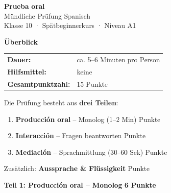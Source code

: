 \documentclass[11pt, a4paper]{article}
\newcommand{\teil}[2]{\noindent\textbf{\large Teil #1: #2}}
\begin{document}
\begin{center}
    {\LARGE\bfseries Prueba oral}\\[4pt]
    {\large Mündliche Prüfung Spanisch}\\[8pt]
    {\normalsize Klasse 10 · Spätbeginnerkurs · Niveau A1}
\end{center}

\vspace{8pt}


\begin{infobox}
\textbf{Überblick}

\vspace{4pt}

\begin{tabular}{@{}ll@{}}
\textbf{Dauer:} & ca. 5--6 Minuten pro Person \\
\textbf{Hilfsmittel:} & keine \\
\textbf{Gesamtpunktzahl:} & 15 Punkte \\
\end{tabular}

\vspace{6pt}

Die Prüfung besteht aus \textbf{drei Teilen}:
\begin{enumerate}[leftmargin=2em, itemsep=2pt]
    \item \textbf{Producción oral} -- Monolog (1--2 Min)  Punkte
    \item \textbf{Interacción} -- Fragen beantworten  Punkte
    \item \textbf{Mediación} -- Sprachmittlung (30--60 Sek)  Punkte
\end{enumerate}

\vspace{2pt}
Zusätzlich: \textbf{Aussprache \& Flüssigkeit}  Punkte
\end{infobox}

\vspace{4pt}


\teil{1}{Producción oral -- Monolog} \hfill \textbf{6 Punkte}

\vspace{4pt}
\end{document}
